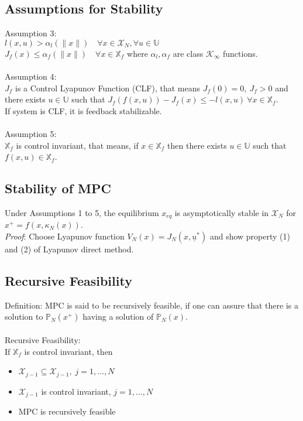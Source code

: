 \documentclass[english]{latex4ei/latex4ei_sheet}
\begin{document}
\begin{sectionbox}

\subsection{Assumptions for Stability}
Assumption 3:\\
$l(x, u)>\alpha_{l}(\|x\|) \quad \forall x \in \mathcal{X}_{N}, \forall u \in \mathbb{U}$ \\ 
$J_{f}(x) \leq \alpha_{f}(\|x\|) \quad \forall x \in \mathbb{X}_{f}$ where $\alpha_{l}, \alpha_{f}$ are class $\mathcal{K}_{\infty}$ functions.\\
\\
Assumption 4:\\
$J_f$ is a Control Lyapunov Function (CLF), that means $J_f(0)=0,\ J_f>0$ and there exists $u\in\mathbb{U}$ such that $J_f(f(x,u))-J_f(x)\leq-l(x,u)\ \forall x\in\mathbb{X}_f$.\\
If system is CLF, it is feedback stabilizable.\\
\\
Assumption 5:\\
$\mathbb{X}_f$ is control invariant, that means, if $x\in\mathbb{X}_f$ then there exists $u\in\mathbb{U}$ such that $f(x,u)\in\mathbb{X}_f$.\\ 

\subsection{Stability of MPC}
Under Assumptions 1 to 5, the equilibrium $x_{eq}$ is asymptotically stable in $\mathcal{X}_N$ for $x^{+}=f(x,\kappa_{N}(x))$.\\
\textit{Proof}: Choose Lyapunov function $V_N(x)=J_N(x,\underline{u}^{*})$ and show property (1) and (2) of Lyapunov direct method.\\

\subsection{Recursive Feasibility}
Definition: MPC is said to be recursively feasible, if one can assure that there is a solution to $\mathbb{P}_N(x^{+})$ having a solution of $\mathbb{P}_N(x)$.\\
\\
Recursive Feasibility:\\
If $\mathbb{X}_f$ is control invariant, then\\
\begin{itemize}
    \item $\mathcal{X}_{j-1}\subseteq\mathcal{X}_{j-1},\;j=1,\ldots,N$
    \item $\mathcal{X}_{j-1}$ is control invariant, $j=1,\ldots,N$
    \item MPC is recursively feasible
\end{itemize}

\end{sectionbox}
\end{document}
